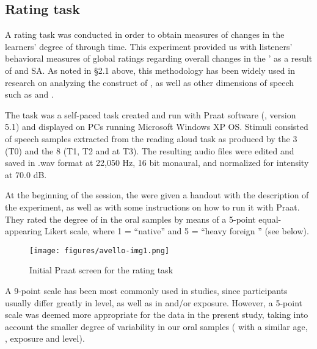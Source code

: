 \documentclass[output=paper]{langsci/langscibook}
\begin{document}
  \z
\z

 
\subsection{Rating task}


A rating task was conducted in order to obtain measures of changes in the learners’ degree of  through time. This experiment provided us with listeners’ behavioral measures of global  ratings regarding overall changes in the ’  as a result of  and SA. As noted in §2.1 above, this methodology has been widely used in research on   analyzing the construct of , as well as other dimensions of  speech such as  and .

The task was a self-paced task created and run with Praat software (\citealt{BoersmaWeenink2008}, version 5.1) and displayed on PCs running Microsoft Windows XP OS. Stimuli consisted of speech samples extracted from the reading aloud task as produced by the 3  (T0) and the 8  (T1, T2 and at T3). The resulting audio files were edited and saved in .wav format at 22,050 Hz, 16 bit monaural, and normalized for intensity at 70.0 dB.

At the beginning of the session, the  were given a handout with the description of the experiment, as well as with some instructions on how to run it with Praat. They rated the degree of  in the oral samples by means of a 5-point equal-appearing Likert scale, where 1 = “native” and 5 = “heavy foreign ” (see  below). 

  
\begin{figure}
\caption{\label{fig:avello:1} Initial Praat screen for the rating task}
\texttt{[image: figures/avello-img1.png]}
\end{figure}



A 9-point scale has been most commonly used in  studies, since participants usually differ greatly in  level, as well as in  and/or  exposure. However, a 5-point scale was deemed more appropriate for the data in the present study, taking into account the smaller degree of variability in our oral samples ( with a similar age, ,  exposure and  level).
\end{document}
